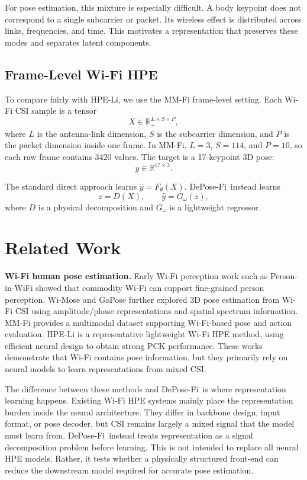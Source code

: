 \documentclass[letterpaper]{article}
\newcommand{\method}{DePose-Fi}
\begin{document}
For pose estimation, this mixture is especially difficult. A body keypoint does not correspond to a single subcarrier or packet. Its wireless effect is distributed across links, frequencies, and time. This motivates a representation that preserves these modes and separates latent components.

\subsection{Frame-Level Wi-Fi HPE}

To compare fairly with HPE-Li, we use the MM-Fi frame-level setting. Each Wi-Fi CSI sample is a tensor
\begin{equation}
X\in \mathbb{R}_{+}^{L\times S\times P},
\end{equation}
where $L$ is the antenna-link dimension, $S$ is the subcarrier dimension, and $P$ is the packet dimension inside one frame. In MM-Fi, $L=3$, $S=114$, and $P=10$, so each raw frame contains $3420$ values. The target is a 17-keypoint 3D pose:
\begin{equation}
y\in\mathbb{R}^{17\times 3}.
\end{equation}

The standard direct approach learns $\hat{y}=F_\theta(X)$. \method\ instead learns
\begin{equation}
z=D(X),\qquad \hat{y}=G_\omega(z),
\end{equation}
where $D$ is a physical decomposition and $G_\omega$ is a lightweight regressor.

\section{Related Work}

\textbf{Wi-Fi human pose estimation.}
Early Wi-Fi perception work such as Person-in-WiFi showed that commodity Wi-Fi can support fine-grained person perception. Wi-Mose and GoPose further explored 3D pose estimation from Wi-Fi CSI using amplitude/phase representations and spatial spectrum information. MM-Fi provides a multimodal dataset supporting Wi-Fi-based pose and action evaluation. HPE-Li is a representative lightweight Wi-Fi HPE method, using efficient neural design to obtain strong PCK performance. These works demonstrate that Wi-Fi contains pose information, but they primarily rely on neural models to learn representations from mixed CSI.

The difference between these methods and \method\ is where representation learning happens. Existing Wi-Fi HPE systems mainly place the representation burden inside the neural architecture. They differ in backbone design, input format, or pose decoder, but CSI remains largely a mixed signal that the model must learn from. \method\ instead treats representation as a signal decomposition problem before learning. This is not intended to replace all neural HPE models. Rather, it tests whether a physically structured front-end can reduce the downstream model required for accurate pose estimation.
\end{document}
